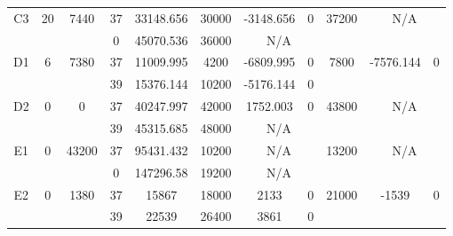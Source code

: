\begin{sidewaystable}
\begin{tabular}{c||c|c||c|c|c|c|c||c|c|c}
         &
        
      \\
      \hline
      \multirow{2}{*}{C3} &
      \multirow{2}{*}{20} &
      \multirow{2}{*}{7440} &
      37 &
      33148.656 &
      30000 &
        -3148.656 &
        0 &
      \multirow{2}{*}{37200} &
        \multicolumn{2}{c}{\multirow{2}{*}{N/A}}
      \\
      \cline{4-8}
       &
       &
       &
      0 &
      45070.536 &
      36000 &
        \multicolumn{2}{|c||}{N/A} &
      
        
      \\
      \hline
      \multirow{2}{*}{D1} &
      \multirow{2}{*}{6} &
      \multirow{2}{*}{7380} &
      37 &
      11009.995 &
      4200 &
        -6809.995 &
        0 &
      \multirow{2}{*}{7800} &
        \multirow{2}{*}{-7576.144} &
        \multirow{2}{*}{0}
      \\
      \cline{4-8}
       &
       &
       &
      39 &
      15376.144 &
      10200 &
        -5176.144 &
        0 &
      
         &
        
      \\
      \hline
      \multirow{2}{*}{D2} &
      \multirow{2}{*}{0} &
      \multirow{2}{*}{0} &
      37 &
      40247.997 &
      42000 &
        1752.003 &
        0 &
      \multirow{2}{*}{43800} &
        \multicolumn{2}{c}{\multirow{2}{*}{N/A}}
      \\
      \cline{4-8}
       &
       &
       &
      39 &
      45315.685 &
      48000 &
        \multicolumn{2}{|c||}{N/A} &
      
        
      \\
      \hline
      \multirow{2}{*}{E1} &
      \multirow{2}{*}{0} &
      \multirow{2}{*}{43200} &
      37 &
      95431.432 &
      10200 &
        \multicolumn{2}{|c||}{N/A} &
      \multirow{2}{*}{13200} &
        \multicolumn{2}{c}{\multirow{2}{*}{N/A}}
      \\
      \cline{4-8}
       &
       &
       &
      0 &
      147296.58 &
      19200 &
        \multicolumn{2}{|c||}{N/A} &
      
        
      \\
      \hline
      \multirow{2}{*}{E2} &
      \multirow{2}{*}{0} &
      \multirow{2}{*}{1380} &
      37 &
      15867 &
      18000 &
        2133 &
        0 &
      \multirow{2}{*}{21000} &
        \multirow{2}{*}{-1539} &
        \multirow{2}{*}{0}
      \\
      \cline{4-8}
       &
       &
       &
      39 &
      22539 &
      26400 &
        3861 &
        0 &
      

\end{tabular}
\end{sidewaystable}
